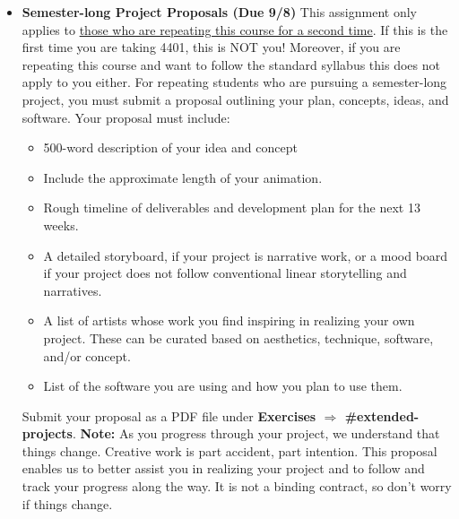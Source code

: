 \def\tues{9/8}%
\def\thur{9/10}%
% 
\begin{itemize}[noitemsep,topsep=0pt,leftmargin=*]
    \item \textbf{Semester-long Project Proposals (Due \tues)} This assignment only applies to \ul{those who are repeating this course for a second time}. If this is the first time you are taking 4401, this is NOT you! Moreover, if you are repeating this course and want to follow the standard syllabus this does not apply to you either. For repeating students who are pursuing a semester-long project, you must submit a proposal outlining your plan, concepts, ideas, and software. Your proposal must include:
          \begin{itemize}
              \item 500-word description of your idea and concept
              \item Include the approximate length of your animation.
              \item Rough timeline of deliverables and development plan for the next 13 weeks.
              \item A detailed storyboard, if your project is narrative work, or a mood board if your project does not follow conventional linear storytelling and narratives.
              \item A list of artists whose work you find inspiring in realizing your own project. These can be curated based on aesthetics, technique, software, and/or concept.
              \item List of the software you are using and how you plan to use them.
          \end{itemize}
    Submit your proposal as a PDF file under \textbf{Exercises $\Rightarrow$ \#extended-projects}. \newline
    \small{\textbf{Note:} As you progress through your project, we understand that things change. Creative work is part accident, part intention. This proposal enables us to better assist you in realizing your project and to follow and track your progress along the way. It is not a binding contract, so don't worry if things change.}
\end{itemize}
\vspace{1em}

